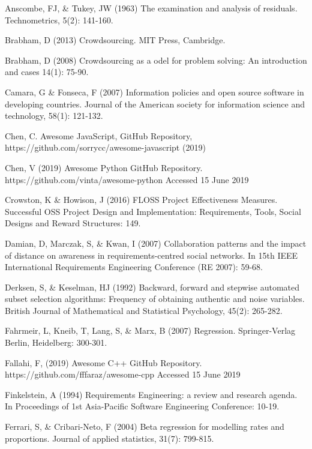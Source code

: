 \begin{thebibliography}{}

Anscombe, FJ, \& Tukey, JW (1963) The examination and analysis of residuals. Technometrics, 5(2): 141-160.

Brabham, D (2013) Crowdsourcing. MIT Press, Cambridge.

Brabham, D (2008) Crowdsourcing as a odel for problem solving: An introduction and cases 14(1): 75-90.

Camara, G \& Fonseca, F (2007) Information policies and open source software in developing countries. Journal of the American society for information science and technology, 58(1): 121-132.

Chen, C. Awesome JavaScript, GitHub Repository, https://github.com/sorrycc/awesome-javascript (2019)

Chen, V (2019) Awesome Python GitHub Repository. https://github.com/vinta/awesome-python Accessed 15 June 2019

Crowston, K \& Howison, J (2016) FLOSS Project Effectiveness Measures. Successful OSS Project Design and Implementation: Requirements, Tools, Social Designs and Reward Structures: 149.

Damian, D, Marczak, S, \& Kwan, I (2007) Collaboration patterns and the impact of distance on awareness in requirements-centred social networks. In 15th IEEE International Requirements Engineering Conference (RE 2007): 59-68.

Derksen, S, \& Keselman, HJ (1992) Backward, forward and stepwise automated subset selection algorithms: Frequency of obtaining authentic and noise variables. British Journal of Mathematical and Statistical Psychology, 45(2): 265-282.

Fahrmeir, L, Kneib, T, Lang, S, \& Marx, B (2007) Regression. Springer-Verlag Berlin, Heidelberg: 300-301.

Fallahi, F, (2019) Awesome C++ GitHub Repository. https://github.com/fffaraz/awesome-cpp Accessed 15 June 2019

Finkelstein, A (1994) Requirements Engineering: a review and research agenda. In Proceedings of 1st Asia-Pacific Software Engineering Conference: 10-19.

Ferrari, S, \& Cribari-Neto, F (2004) Beta regression for modelling rates and proportions. Journal of applied statistics, 31(7): 799-815.


\end{thebibliography}
